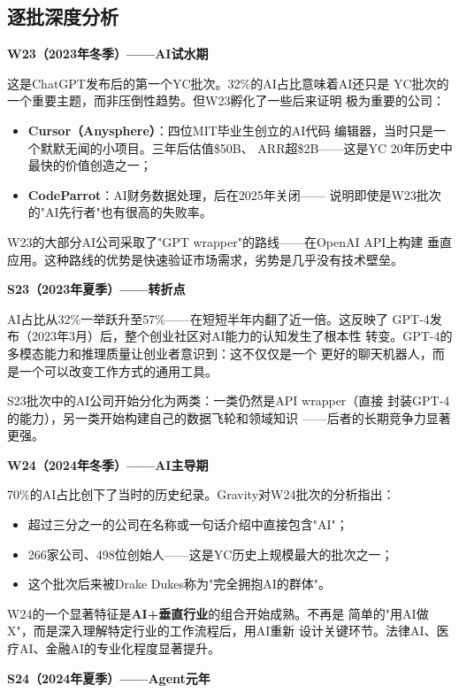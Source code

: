 \subsection{逐批深度分析}
\label{subsec:fund-yc-deep}

\textbf{W23（2023年冬季）——AI试水期}

这是ChatGPT发布后的第一个YC批次。32\%的AI占比意味着AI还只是
YC批次的一个重要主题，而非压倒性趋势。但W23孵化了一些后来证明
极为重要的公司：

\begin{itemize}
  \item \textbf{Cursor（Anysphere）}：四位MIT毕业生创立的AI代码
    编辑器，当时只是一个默默无闻的小项目。三年后估值\$50B、
    ARR超\$2B——这是YC 20年历史中最快的价值创造之一；
  \item \textbf{CodeParrot}：AI财务数据处理，后在2025年关闭——
    说明即使是W23批次的"AI先行者"也有很高的失败率。
\end{itemize}

W23的大部分AI公司采取了"GPT wrapper"的路线——在OpenAI API上构建
垂直应用。这种路线的优势是快速验证市场需求，劣势是几乎没有技术壁垒。

\textbf{S23（2023年夏季）——转折点}

AI占比从32\%一举跃升至57\%——在短短半年内翻了近一倍。这反映了
GPT-4发布（2023年3月）后，整个创业社区对AI能力的认知发生了根本性
转变。GPT-4的多模态能力和推理质量让创业者意识到：这不仅仅是一个
更好的聊天机器人，而是一个可以改变工作方式的通用工具。

S23批次中的AI公司开始分化为两类：一类仍然是API wrapper（直接
封装GPT-4的能力），另一类开始构建自己的数据飞轮和领域知识
——后者的长期竞争力显著更强。

\textbf{W24（2024年冬季）——AI主导期}

70\%的AI占比创下了当时的历史纪录。Gravity对W24批次的分析指出：
\begin{itemize}
  \item 超过三分之一的公司在名称或一句话介绍中直接包含"AI"；
  \item 266家公司、498位创始人——这是YC历史上规模最大的批次之一；
  \item 这个批次后来被Drake Dukes称为"完全拥抱AI的群体"。
\end{itemize}

W24的一个显著特征是\textbf{AI+垂直行业}的组合开始成熟。不再是
简单的"用AI做X"，而是深入理解特定行业的工作流程后，用AI重新
设计关键环节。法律AI、医疗AI、金融AI的专业化程度显著提升。

\textbf{S24（2024年夏季）——Agent元年}

